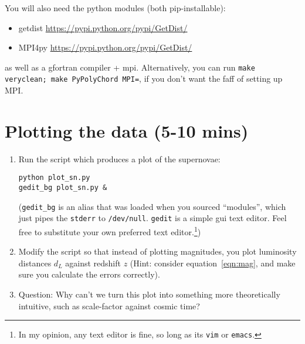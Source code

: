 \documentclass{article}
\begin{document}
You will also need the python modules (both pip-installable):
\begin{itemize}
    \item getdist \url{https://pypi.python.org/pypi/GetDist/}
    \item MPI4py  \url{https://pypi.python.org/pypi/GetDist/}
\end{itemize}
as well as a gfortran compiler + mpi. Alternatively, you can run \lstinline{make veryclean; make PyPolyChord MPI=}, if you don't want the faff of setting up MPI.

\section{Plotting the data (5-10 mins)}
\begin{enumerate}
    \item Run the script which produces a plot of the supernovae:
        \begin{lstlisting}
python plot_sn.py
gedit_bg plot_sn.py &
        \end{lstlisting}
        (\lstinline{gedit_bg} is an alias that was loaded when you sourced ``modules'', which just pipes the \lstinline{stderr} to \lstinline{/dev/null}. \lstinline{gedit} is a simple gui text editor. Feel free to substitute your own preferred text editor.\footnote{In my opinion, any text editor is fine, so long as its \lstinline{vim} or \lstinline{emacs}.})
    \item Modify the script so that instead of plotting magnitudes, you plot luminosity distances $d_L$ against redshift $z$ (Hint: consider equation~\eqref{eqn:mag}, and make sure you calculate the errors correctly).
    \item Question: Why can't we turn this plot into something more theoretically intuitive, such as scale-factor against cosmic time?
\end{enumerate}
\end{document}
